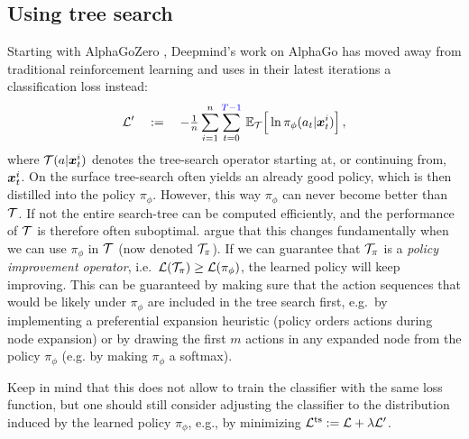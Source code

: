\subsection{Using tree search}
Starting with AlphaGoZero \citep{Silver17}, 
Deepmind's work on AlphaGo \citep{Silver16}
has moved away from traditional reinforcement learning
and uses in their latest iterations \citep{Silver18, Schrittwieser20}
a classification loss instead:
$$
	\mathcal{L}' \quad:=\quad
	-{\textstyle \frac{1}{n}} \sum_{i=1}^{n} \sum_{t=0}^{{\color{blue}T-1}}\,  
	\mathbb{E}_{\mathcal{T}}\Big[ \ln \pi_\phi(a_t| \bm x^i_t) \Big] \,,
$$
where $\mathcal{T}(a|\bm x^i_t)$ denotes the tree-search operator
starting at, or continuing from, $\bm x^i_t$. 
On the surface tree-search often yields an already good policy,
which is then distilled into the policy $\pi_\phi$.
However, this way $\pi_\phi$ can never become better than $\mathcal{T}$.
If not the entire search-tree can be computed efficiently,
and the performance of $\mathcal{T}$ is therefore often suboptimal.
\citet{Silver17} argue that this changes fundamentally 
when we can use $\pi_\phi$ in $\mathcal{T}$ (now denoted $\mathcal{T}_\pi$).
If we can guarantee that $\mathcal{T}_\pi$ is a {\em policy improvement 
operator}, i.e.~$\mathcal{L}(\mathcal{T}_\pi) \geq \mathcal{L}(\pi_\phi)$,
the learned policy will keep improving.
This can be guaranteed by making sure that the 
action sequences that would be likely under $\pi_\phi$
are included in the tree search first,
e.g.~by implementing a preferential expansion heuristic
(policy orders actions during node expansion)
or by drawing the first $m$ actions in any expanded node
from the policy $\pi_\phi$ (e.g. by making $\pi_\phi$ a softmax). 

Keep in mind that this does not allow to train the classifier
with the same loss function, but one should still consider
adjusting the classifier to the distribution induced by
the learned policy $\pi_\phi$,
e.g., by minimizing $\mathcal{L}^\text{ts} := \mathcal{L} + \lambda \mathcal{L}'$.

